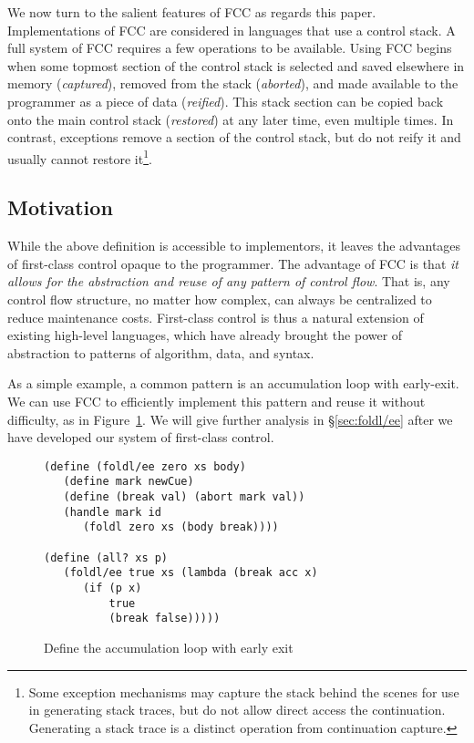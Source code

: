 \documentclass[11pt]{article}
\begin{document}
We now turn to the salient features of FCC as regards this paper.
Implementations of FCC are considered in languages that use a control stack.
A full system of FCC requires a few operations to be available.
Using FCC begins when some topmost section of the control stack is selected and saved elsewhere in memory (\emph{captured}), removed from the stack (\emph{aborted}), and made available to the programmer as a piece of data (\emph{reified}).
This stack section can be copied back onto the main control stack (\emph{restored}) at any later time, even multiple times.
In contrast, exceptions remove a section of the control stack, but do not reify it and usually cannot restore it\footnote{Some exception mechanisms may capture the stack behind the scenes for use in generating stack traces, but do not allow direct access the continuation. Generating a stack trace is a distinct operation from continuation capture.}.

\subsection{Motivation}

While the above definition is accessible to implementors, it leaves the advantages of first-class control opaque to the programmer.
The advantage of FCC is that \emph{it allows for the abstraction and reuse of any pattern of control flow}.
That is, any control flow structure, no matter how complex, can always be centralized to reduce maintenance costs.
First-class control is thus a natural extension of existing high-level languages, which have already brought the power of abstraction to patterns of algorithm, data, and syntax.

As a simple example, a common pattern is an accumulation loop with early-exit.
We can use FCC to efficiently implement this pattern and reuse it without difficulty, as in Figure~\ref{fig:ex-foldl/ee}.
We will give further analysis in \S\ref{sec:foldl/ee} after we have developed our system of first-class control.

\begin{figure}
\caption{Define the accumulation loop with early exit}
\label{fig:ex-foldl/ee}
\begin{verbatim}
(define (foldl/ee zero xs body)
   (define mark newCue)
   (define (break val) (abort mark val))
   (handle mark id
      (foldl zero xs (body break))))

(define (all? xs p)
   (foldl/ee true xs (lambda (break acc x)
      (if (p x)
          true
          (break false)))))
\end{verbatim}
\end{figure}
\end{document}
